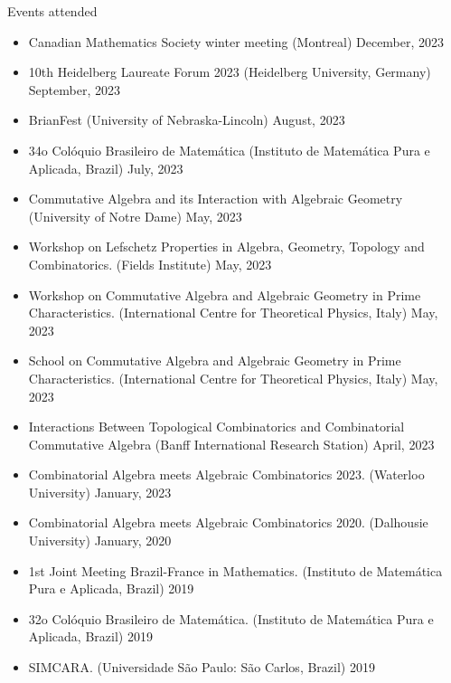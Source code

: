 \documentclass{resume} %
\begin{document}


\begin{rSection}{Events attended}

    \begin{itemize}[label={}]
        \item Canadian Mathematics Society winter meeting (Montreal) December, 2023
        \item 10th Heidelberg Laureate Forum 2023 (Heidelberg University, Germany) September, 2023
        \item BrianFest (University of Nebraska-Lincoln) August, 2023
        \item 34o Colóquio Brasileiro de Matemática (Instituto de Matemática Pura e Aplicada, Brazil) July, 2023
        \item Commutative Algebra and its Interaction with Algebraic Geometry (University of Notre Dame) May, 2023
        \item Workshop on Lefschetz Properties in Algebra, Geometry, Topology and Combinatorics. (Fields Institute) May, 2023
        \item Workshop on Commutative Algebra and Algebraic Geometry in Prime Characteristics. (International Centre for Theoretical Physics, Italy) May, 2023
        \item School on Commutative Algebra and Algebraic Geometry in Prime Characteristics. (International Centre for Theoretical Physics, Italy) May, 2023
        \item Interactions Between Topological Combinatorics and Combinatorial Commutative Algebra (Banff International Research Station) April, 2023
        \item Combinatorial Algebra meets Algebraic Combinatorics 2023. (Waterloo University) January, 2023
        \item Combinatorial Algebra meets Algebraic Combinatorics 2020. (Dalhousie University) January, 2020
        \item 1st Joint Meeting Brazil-France in Mathematics. (Instituto de Matemática Pura e Aplicada, Brazil) 2019
        \item 32o Colóquio Brasileiro de Matemática. (Instituto de Matemática Pura e Aplicada, Brazil) 2019
        \item SIMCARA. (Universidade São Paulo: São Carlos, Brazil) 2019

\end{itemize}
\end{rSection}
\end{document}
